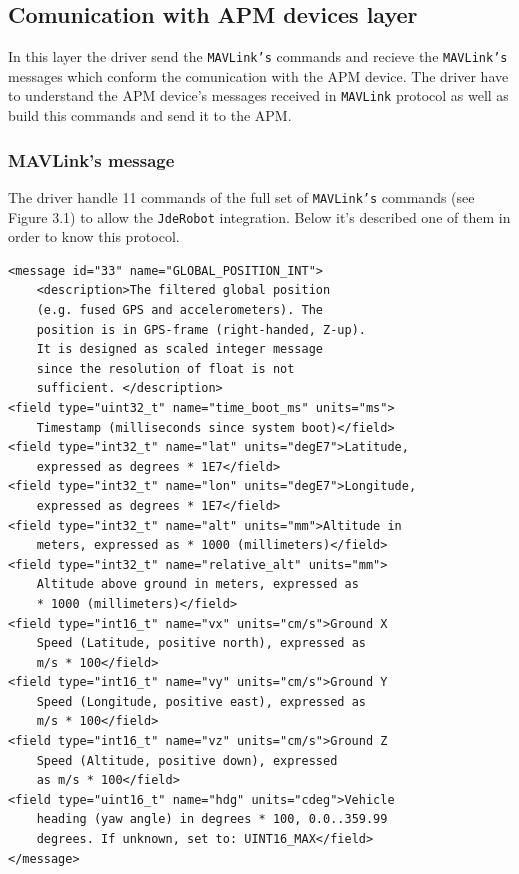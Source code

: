 \documentclass{llncs}
\begin{document}
\subsection{Comunication with APM devices layer}
\label{sec:apm_comunication}

In this layer the driver send the \texttt{MAVLink's} commands and recieve the \texttt{MAVLink's} messages which conform the comunication with the APM device.
The driver have to understand the APM device's messages received in \texttt{MAVLink} protocol as well as build this commands and send it to the APM.

\subsubsection{MAVLink's message}

The driver handle 11 commands of the full set of \texttt{MAVLink's} commands (see Figure 3.1) to allow the \texttt{JdeRobot} integration. Below it's described one of them in order to know this protocol.

\begin{verbatim}
<message id="33" name="GLOBAL_POSITION_INT">
	<description>The filtered global position 
	(e.g. fused GPS and accelerometers). The 
	position is in GPS-frame (right-handed, Z-up).
	It is designed as scaled integer message 
	since the resolution of float is not 
	sufficient.	</description>
<field type="uint32_t" name="time_boot_ms" units="ms">
	Timestamp (milliseconds since system boot)</field>
<field type="int32_t" name="lat" units="degE7">Latitude, 
	expressed as degrees * 1E7</field>
<field type="int32_t" name="lon" units="degE7">Longitude, 
	expressed as degrees * 1E7</field>
<field type="int32_t" name="alt" units="mm">Altitude in 
	meters, expressed as * 1000 (millimeters)</field>
<field type="int32_t" name="relative_alt" units="mm">
	Altitude above ground in meters, expressed as 
	* 1000 (millimeters)</field>
<field type="int16_t" name="vx" units="cm/s">Ground X 
	Speed (Latitude, positive north), expressed as 
	m/s * 100</field>
<field type="int16_t" name="vy" units="cm/s">Ground Y 
	Speed (Longitude, positive east), expressed as 
	m/s * 100</field>
<field type="int16_t" name="vz" units="cm/s">Ground Z 
	Speed (Altitude, positive down), expressed 
	as m/s * 100</field>
<field type="uint16_t" name="hdg" units="cdeg">Vehicle 
	heading (yaw angle) in degrees * 100, 0.0..359.99 
	degrees. If unknown, set to: UINT16_MAX</field>
</message>
\end{verbatim}
\end{document}
